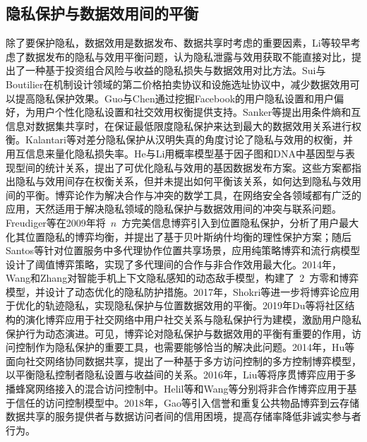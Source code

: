 
\subsection{隐私保护与数据效用间的平衡}
除了要保护隐私，数据效用是数据发布、数据共享时考虑的重要因素，Li等\cite{li2009tradeoff}较早考虑了数据发布的隐私与效用平衡问题，认为隐私泄露与效用获取不能直接对比，提出了一种基于投资组合风险与收益的隐私损失与数据效用对比方法。Sui与Boutilier\cite{sui2011efficiency}在机制设计领域的第二价格拍卖协议和设施选址协议中，减少数据效用可以提高隐私保护效果。Guo与Chen\cite{guo2012mining}通过挖掘Facebook的用户隐私设置和用户偏好，为用户个性化隐私设置和社交效用权衡提供支持。Sanker等\cite{sankar2013utility}提出用条件熵和互信息对数据集共享时，在保证最低限度隐私保护来达到最大的数据效用关系进行权衡。Kalantari等\cite{kalantari2018robust}对差分隐私保护从汉明失真的角度讨论了隐私与效用的权衡，并用互信息来量化隐私损失率。He与Li\cite{he2019modeling}用概率模型基于因子图和DNA中基因型与表现型间的统计关系，提出了可优化隐私与效用的基因数据发布方案。这些方案都指出隐私与效用间存在权衡关系，但并未提出如何平衡该关系，如何达到隐私与效用间的平衡。博弈论作为解决合作与冲突的数学工具，在网络安全各领域都有广泛的应用\cite{zhu2018game}，天然适用于解决隐私领域的隐私保护与数据效用间的冲突与联系问题。Freudiger等\cite{freudiger2009non}在2009年将~$n$~方完美信息博弈引入到位置隐私保护，分析了用户最大化其位置隐私的博弈均衡，并提出了基于贝叶斯纳什均衡的理性保护方案；随后Santos等\cite{santos2011collaborative}针对位置服务中多代理协作位置共享场景，应用纯策略博弈和流行病模型设计了阈值博弈策略，实现了多代理间的合作与非合作效用最大化。2014年，Wang和Zhang\cite{wang2014stochastic}对智能手机上下文隐私感知的动态敌手模型，构建了~2~方零和博弈模型，并设计了动态优化的隐私防护措施。2017年，Shokri等\cite{shokri2017privacy}进一步将博弈论应用于优化的轨迹隐私，实现隐私保护与位置数据效用的平衡。2019年Du等\cite{du2018community}将社区结构的演化博弈应用于社交网络中用户社交关系与隐私保护行为建模，激励用户隐私保护行为动态演进。可见，博弈论对隐私保护与数据效用的平衡有重要的作用，访问控制作为隐私保护的重要工具\cite{wang2011quantified,nabeel2014privacy,zhang2018privacy}，也需要能够恰当的解决此问题。2014年，Hu等\cite{hu2014game}面向社交网络协同数据共享，提出了一种基于多方访问控制的多方控制博弈模型，以平衡隐私控制者隐私设置与收益间的关系。2016年，Liu等\cite{liu2016dynamic}将序贯博弈应用于多播蜂窝网络接入的混合访问控制中。Helil等\cite{helil2017non}和Wang等\cite{wang2019game}分别将非合作博弈应用于基于信任的访问控制模型中。2018年，Gao等\cite{gao2018game}引入信誉和重复公共物品博弈到云存储数据共享的服务提供者与数据访问者间的信用困境，提高存储率降低非诚实参与者行为。

